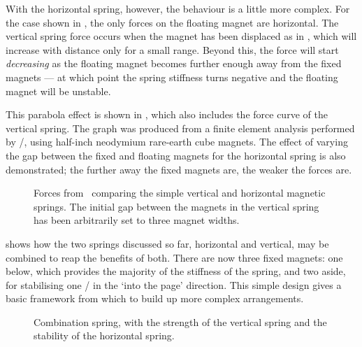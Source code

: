 With the horizontal spring, however, the behaviour is a little more
complex. For the case shown in , the only forces
on the floating magnet are horizontal. The vertical spring force
occurs when the magnet has been displaced as in ,
which will increase with distance only for a small range. Beyond this,
the force will start \emph{decreasing} as the floating magnet becomes
further enough away from the fixed magnets — at which point the spring
stiffness turns negative and the floating magnet will be unstable.

This parabola effect is shown in , which also
includes the force curve of the vertical spring. The graph was
produced from a finite element analysis performed by \ANSYS/, using
half-inch neodymium rare-earth cube magnets.
The effect of varying the gap between the fixed and floating magnets for the
horizontal spring is also demonstrated; the further away the fixed magnets
are, the weaker the forces are.

\begin{figure}
  \begin{wide}
    \raggedout
    \hfill
    \hfill
    \null
  \end{wide}
  \caption[Spring forces of the vertical \& horizontal springs.]{Forces from
\FEA\ comparing the simple vertical and horizontal magnetic springs.
The initial gap between the magnets in the vertical spring has been arbitrarily
set to three magnet widths.}
\end{figure}

 shows how the two springs discussed so far,
horizontal and vertical, may be combined to reap the benefits of
both. There are now three fixed magnets: one below, which provides the
majority of the stiffness of the spring, and two aside, for
stabilising one \dof/ in the `into the page'
direction. This simple design gives a basic framework from which to
build up more complex arrangements.

\begin{figure}
   \caption[Combination vertical/horizontal spring.]{Combination
spring, with the
strength of the vertical spring and the stability of the horizontal spring.}
\end{figure}


